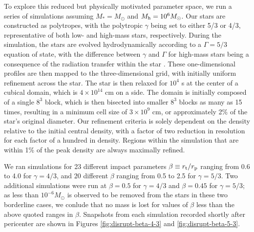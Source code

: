 \documentclass[twocolumn]{emulateapj}
\newcommand{\ms}{M_{\ast}}
\newcommand{\rt}{r_{\rm t}}
\newcommand{\mh}{M_{\rm h}}
\newcommand{\msun}{M_{\odot}}
\begin{document}
To explore this reduced but physically motivated parameter space, we run a series of simulations assuming $\ms = \msun$ and $\mh = 10^{6} \msun$. Our stars are constructed as polytropes, with the polytropic $\gamma$ being set to either 5/3 or 4/3, representative of both low- and high-mass stars, respectively. During the simulation, the stars are evolved hydrodynamically according to a $\Gamma = 5/3$ equation of state, with the difference between $\gamma$ and $\Gamma$ for high-mass stars being a consequence of the radiation transfer within the star \citep{Chandrasekhar:1939vw}. These one-dimensional profiles are then mapped to the three-dimensional grid, with initially uniform refinement across the star. The star is then relaxed for $10^{4}$ s at the center of a cubical domain, which is $4 \times 10^{14}$ cm on a side. The domain is initially composed of a single $8^{3}$ block, which is then bisected into smaller $8^{3}$ blocks as many as 15 times, resulting in a minimum cell size of $3 \times 10^{9}$ cm, or approximately 2\% of the star's original diameter. Our refinement criteria is solely dependent on the density relative to the initial central density, with a factor of two reduction in resolution for each factor of a hundred in density. Regions within the simulation that are within 1\% of the peak density are always maximally refined.

We ran simulations for 23 different impact parameters $\beta \equiv \rt/r_{\rm p}$ ranging from 0.6 to 4.0 for $\gamma = 4/3$, and 20 different $\beta$ ranging from 0.5 to 2.5 for $\gamma = 5/3$. Two additional simulations were run at $\beta = 0.5$ for $\gamma = 4/3$ and $\beta = 0.45$ for $\gamma = 5/3$; as less than $10^{-6} \msun$ is observed to be removed from the stars in these two borderline cases, we conlude that no mass is lost for values of $\beta$ less than the above quoted ranges in $\beta$. Snapshots from each simulation recorded shortly after pericenter are shown in Figures \ref{fig:disrupt-beta-4-3} and \ref{fig:disrupt-beta-5-3}.
\end{document}
